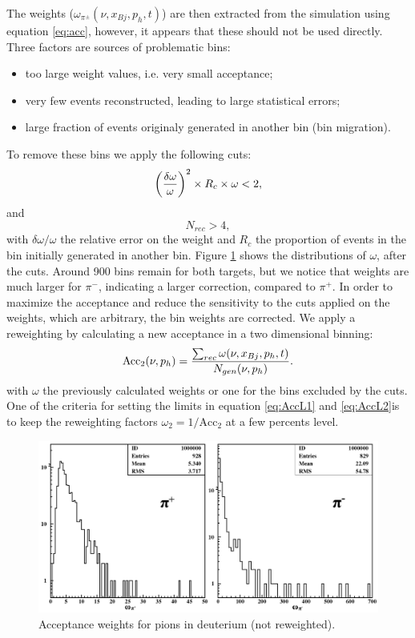 The weights ($\omega_{\pi^\pm}(\nu,x_{Bj},p_h,t)$) are then extracted from 
the simulation using equation \ref{eq:acc}, however, it appears that these should not be used directly.
Three factors are sources of problematic bins:
\begin{itemize}
 \item too large weight values, i.e. very small acceptance;
 \item very few events reconstructed, leading to large statistical errors;
 \item large fraction of events originaly generated in another bin (bin migration).
\end{itemize}
To remove these bins we apply the following cuts:
\begin{equation} \label{eq:AccL1}
\left ({\delta \omega \over \omega}\right ) ^2 \times R_c \times \omega < 2,
\end{equation}
and
\begin{equation} \label{eq:AccL2}
N_{rec} > 4,
\end{equation}
with $\delta \omega / \omega$ the relative error on the weight and $R_c$ the 
proportion of events in the bin initially generated in another bin. Figure 
\ref{fig:AccCoef} shows the distributions of $\omega$, after the cuts. Around 
900 bins remain for both targets, but we notice that weights are much larger 
for $\pi^-$, indicating a larger correction, compared to $\pi^+$. In order to 
maximize the acceptance and reduce the sensitivity to the cuts applied on the 
weights, which are arbitrary, the bin weights are corrected. We apply a 
reweighting by calculating a new acceptance in a two dimensional binning:
\begin{equation}
\text{Acc}_2(\nu,p_h) = {\sum_{rec} \omega (\nu,x_{Bj},p_h,t)\over N_{gen}(\nu,p_h)}.
\end{equation}
with $\omega$ the previously calculated weights or one for the 
bins excluded by the cuts.
One of the criteria for setting the limits in equation \ref{eq:AccL1} and 
\ref{eq:AccL2}is to keep the reweighting factors $\omega_2 = 1/\text{Acc}_2$ at a few 
percents level.

\begin{figure}[tbp]
\centering
\includegraphics[width=14cm] {chap5-fig/pawpipdeut.png}
\caption {Acceptance weights for pions in deuterium (not reweighted).}
\label{fig:AccCoef}
\end{figure}

